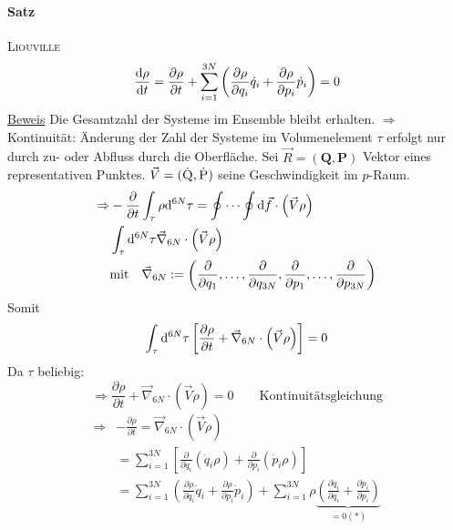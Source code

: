 \paragraph{Satz} \textsc{Liouville}
\begin{equation}
    \frac{\mathrm{d} \rho}{\mathrm{d} t} = \frac{\partial \rho}{\partial t} + \sum_{i=1}^{3 N} \left( \frac{\partial \rho}{\partial q_i} \dot{q}_i + \frac{\partial \rho}{\partial p_i} \dot{p}_i \right) = 0
\end{equation}
\underline{Beweis} Die Gesamtzahl der Systeme im Ensemble bleibt erhalten. $\Rightarrow$ Kontinuität: Änderung der Zahl der Systeme im Volumenelement
$\tau$ erfolgt nur durch zu- oder Abfluss durch die Oberfläche. Sei $\vec{R} = (\textbf{Q}, \textbf{P})$ Vektor eines representativen Punktes.
$\vec{V} = (\dot{\textsc{Q}}, \dot{\textsc{P}})$ seine Geschwindigkeit im $p$-Raum.
\begin{equation}
    \begin{split}
        \Rightarrow & - \frac{\partial}{\partial t} \int_\tau \rho \mathrm{d}^{6N} \tau = \oint \cdots \oint \mathrm{d} \vec{f} \cdot \left( \vec{V} \rho \right) \\
        & \int_\tau \mathrm{d}^{6N} \tau \vec{\nabla}_{6N} \cdot \left( \vec{V} \rho \right) \\
        & \text{mit} \quad \vec{\nabla}_{6N} := \left( \frac{\partial}{\partial q_1}, \ldots, \frac{\partial}{\partial q_{3N}}, \frac{\partial}{\partial p_1}, \ldots, \frac{\partial}{\partial p_{3N}} \right)
    \end{split}
\end{equation}
Somit
\begin{equation}
    \int_\tau \mathrm{d}^{6N} \tau \left[ \frac{\partial \rho}{\partial t} + \vec{\nabla}_{6N} \cdot \left( \vec{V} \rho \right)  \right] = 0
\end{equation}
Da $\tau$ beliebig:
\begin{equation}
    \Rightarrow \frac{\partial \rho}{\partial t} +  \vec{\nabla}_{6N} \cdot \left( \vec{V} \rho \right) = 0 \qquad \text{Kontinuitätsgleichung}
\end{equation}
\begin{equation}
    \begin{split}
        \Rightarrow &  - \frac{\partial \rho}{\partial t} =  \vec{\nabla}_{6N} \cdot \left( \vec{V} \rho \right) \\
        &= \sum_{i=1}^{3N} \left[ \frac{\partial}{\partial q_i} \left( \dot{q}_i \rho \right) + \frac{\partial}{\partial p_i} \left( \dot{p}_i \rho \right)  \right] \\
        &= \sum_{i=1}^{3N} \left( \frac{\partial \rho}{\partial q_i} \dot{q}_i + \frac{\partial \rho}{\partial p_i} \dot{p}_i \right) + \sum_{i=1}^{3N} \rho \underbrace{\left( \frac{\partial \dot{q}_i}{\partial q_i} + \frac{\partial \dot{p}_i}{\partial p_i} \right)}_{=0 (*)}
    \end{split}
\end{equation}

